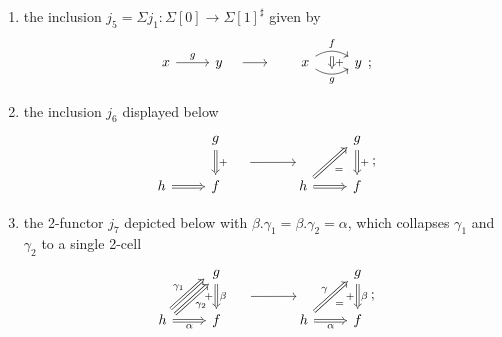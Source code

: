 \documentclass[11pt, dvipsnames]{amsart}
\begin{document}
\begin{defn}
\begin{enumerate}[label=\stlabel{Def:An}, ref=\arabic*]
				\item \label{Def:An.5} the inclusion $j_5=\Sigma j_1\colon \Sigma [0] \to \Sigma [1]^{\sharp}$ given by
				\[
				\begin{tikzcd}
					x & y && x & y
					\arrow[""{name=0, anchor=center, inner sep=0}, "f", bend right={-32pt}, from=1-4, to=1-5]
					\arrow[""{name=1, anchor=center, inner sep=0}, "{g}"', bend right={32pt}, from=1-4, to=1-5]
					\arrow["g", from=1-1, to=1-2]
					\arrow[shorten <=10pt, shorten >=20pt,  from=1-2, to=1-4]
					\arrow["{+}", shorten <=3pt, shorten >=3pt, Rightarrow,from=0, to=1]
				\end{tikzcd};
				\]
				
				\item \label{Def:An.6} the inclusion $j_6$ displayed below 
                \[
				\begin{tikzcd}
					& g &&& g \\
					h & f && h & f
					\arrow[Rightarrow, from=2-1, to=2-2]
					\arrow[Rightarrow, ""{name=0, anchor=center, inner sep=0}, "{+}", from=1-2, to=2-2]
					\arrow[Rightarrow, from=2-4, to=2-5]
					\arrow[Rightarrow, "{+}", from=1-5, to=2-5]
					\arrow[Rightarrow, ""{name=1, anchor=center, inner sep=0}, from=2-4, to=1-5]
					\arrow["="{description}, draw=none, from=1, to=2-5]
					\arrow[shorten <=24pt, shorten >=24pt, from=0, to=1]
				\end{tikzcd};
				\]
				
				\item \label{Def:An.8}  the 2-functor $j_7$ depicted below with $\beta.\gamma_1 = \beta.\gamma_2 = \alpha$, which collapses $\gamma_1$ and $\gamma_2$ to a single 2-cell
                \[
				\begin{tikzcd}
					& g &&& g \\
					h & f && h & f
                    \arrow[Rightarrow, from=2-1, to=1-2, shift left,"\gamma_1"]
                    \arrow[Rightarrow, from=2-1, to=1-2, shift right, "\gamma_2"']
					\arrow[Rightarrow, from=2-1, to=2-2, "\alpha"']
					\arrow[Rightarrow, ""{name=0, anchor=center, inner sep=0}, "{+}"',"\beta", from=1-2, to=2-2]
					\arrow[Rightarrow, from=2-4, to=2-5,"\alpha"']
					\arrow[Rightarrow, "{+}"',"\beta", from=1-5, to=2-5]
					\arrow[Rightarrow, ""{name=1, anchor=center, inner sep=0}, from=2-4, to=1-5,"\gamma"]
					\arrow["="{description}, draw=none, from=1, to=2-5]
                    \arrow["="{description}, draw=none, from=1, to=2-5]
					\arrow[shorten <=24pt, shorten >=24pt, from=0, to=1]
				\end{tikzcd};
				\]
                

\end{enumerate}
\end{defn}
\end{document}
